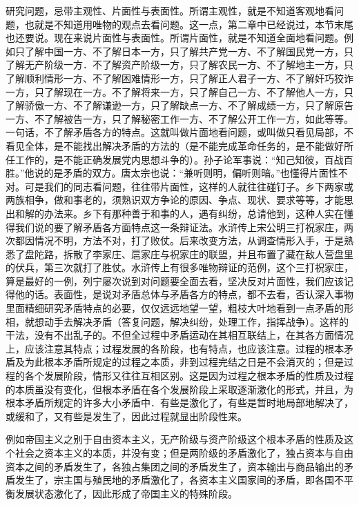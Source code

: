 研究问题，忌带主观性、片面性与表面性。所谓主观性，就是不知道客观地看问题，也就是不知道用唯物的观点去看问题。这一点，第二章中已经说过，本节末尾也还要说。现在来说片面性与表面性。所谓片面性，就是不知道全面地看问题。例如只了解中国一方、不了解日本一方，只了解共产党一方、不了解国民党一方，只了解无产阶级一方．不了解资产阶级一方，只了解农民一方、不了解地主一方，只了解顺利情形一方、不了解困难情形一方，只了解正人君子一方、不了解奸巧狡诈一方，只了解现在一方。不了解将来一方，只了解自己一方、不了解他人一方，只了解骄傲一方、不了解谦逊一方，只了解缺点一方、不了解成绩一方，只了解原告一方、不了解被告一方，只了解秘密工作一方、不了解公开工作一方，如此等等。一句话，不了解矛盾各方的特点。这就叫做片面地看问题，或叫做只看见局部，不看见全体，是不能找出解决矛盾的方法的（是不能完成革命任务的，是不能做好所任工作的，是不能正确发展党内思想斗争的）。孙子论军事说：“知己知彼，百战百胜。”他说的是矛盾的双方。唐太宗也说：“兼听则明，偏听则暗。”也懂得片面性不对。可是我们的同志看问题，往往带片面性，这样的人就往往碰钉子。乡下两家或两族相争，做和事老的，须熟识双方争论的原因、争点、现状、要求等等，才能思出和解的办法来。乡下有那种善于和事的人，遇有纠纷，总请他到，这种人实在懂得我们说的要了解矛盾各方面特点这一条辩证法。水浒传上宋公明三打祝家庄，两次都因情况不明，方法不对，打了败仗。后来改变方法，从调查情形入手，于是熟悉了盘陀路，拆散了李家庄、扈家庄与祝家庄的联盟，并且布置了藏在敌人营盘里的伏兵，第三次就打了胜仗。水浒传上有很多唯物辩证的范例，这个三打祝家庄，算是最好的一例，列宁屡次说到对问题要全面去看，坚决反对片面性，我们应该记得他的话。表面性，是说对矛盾总体与矛盾各方的特点，都不去看，否认深入事物里面精细研究矛盾特点的必要，仅仅远远地望一望，粗枝大叶地看到一点矛盾的形相，就想动手去解决矛盾（答复问题，解决纠纷，处理工作，指挥战争）。这样的干法，没有不出乱子的。不但全过程中矛盾运动在其相互联结上，在其各方面情况上，应该注意其特点；过程发展的各阶段，也有特点，也应该注意。过程的根本矛盾及为此根本矛盾所规定的过程之本质，非到过程完结之日是不会消灭的；但是过程的各个发展阶段，情形又往往互相区别。这是因为过程之根本矛盾的性质及过程的本质虽没有变化，但根本矛盾在各个发展阶段上采取逐渐激化的形式，并且，为根本矛盾所规定的许多大小矛盾中．有些是激化了，有些是暂时地局部地解决了，或缓和了，又有些是发生了，因此过程就显出阶段性来。

例如帝国主义之别于自由资本主义，无产阶级与资产阶级这个根本矛盾的性质及这个社会之资本主义的本质，并没有变；但是两阶级的矛盾激化了，独占资本与自由资本之间的矛盾发生了，各独占集团之间的矛盾发生了，资本输出与商品输出的矛盾发生了，宗主国与殖民地的矛盾激化了，各资本主义国家间的矛盾，即各国不平衡发展状态激化了，因此形成了帝国主义的特殊阶段。

